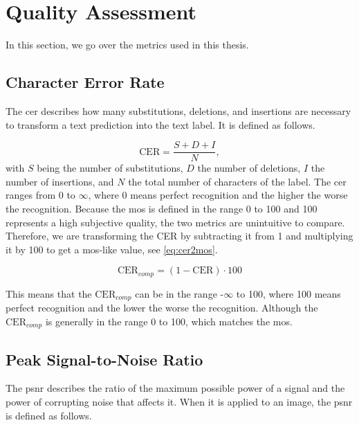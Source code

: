 \chapter{Quality Assessment}
\label{chap:qualityassessment}

In this section, we go over the metrics used in this thesis.

\section{Character Error Rate}
\label{subsec:cer}

The \gls{cer} describes how many substitutions, deletions, and insertions are necessary to transform a text prediction into the text label.
It is defined as follows.

\begin{equation}
    \text{CER} = \frac{S + D + I}{N},
    \label{eq:cer}
\end{equation}
with \(S\) being the number of substitutions, \(D\) the number of deletions, \(I\) the number of insertions, and \(N\) the total number of characters of the label.
The \gls{cer} ranges from 0 to $\infty$, where 0 means perfect recognition and the higher the worse the recognition.
Because the \gls{mos} is defined in the range 0 to 100 and 100 represents a high subjective quality, the two metrics are unintuitive to compare.
Therefore, we are transforming the CER by subtracting it from 1 and multiplying it by 100 to get a \gls{mos}-like value, see \autoref{eq:cer2mos}.

\begin{equation}
    \text{CER}_{comp} = (1 - \text{CER}) \cdot 100
    \label{eq:cer2mos}
\end{equation}

This means that the $\text{CER}_{comp}$ can be in the range -$\infty$ to 100, where 100 means perfect recognition and the lower the worse the recognition.
Although the $\text{CER}_{comp}$ is generally in the range 0 to 100, which matches the \gls{mos}.

\section{Peak Signal-to-Noise Ratio}
\label{subsec:psnr}

The \gls{psnr} \cite{PSNRvsSSIM_2010} describes the ratio of the maximum possible power of a signal and the power of corrupting noise that affects it.
When it is applied to an image, the \gls{psnr} is defined as follows.

